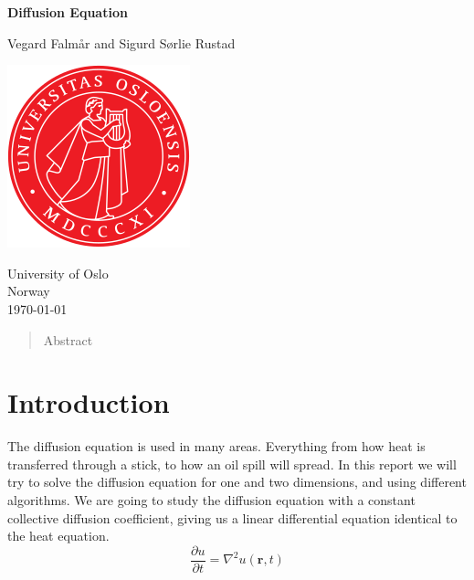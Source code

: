 \documentclass[reprint, english,notitlepage,nofootinbib]{revtex4-1}  %
\begin{document}
\begin{titlepage}
	\begin{center}
	\textbf{Diffusion Equation}

	\vspace{0.2cm}
	Vegard Falmår and Sigurd Sørlie Rustad

	\vspace{0.5cm}
	\includegraphics[scale=0.5]{../../pictures/UIO}
	\vspace{0.8cm}

	University of Oslo\\
	Norway\\
	\today	\\
	\end{center}
	\tableofcontents
	\clearpage
\end{titlepage}

\begin{abstract}
  Abstract
\end{abstract}
\maketitle                              %


\section{Introduction}
The diffusion equation is used in many areas. Everything from how heat is transferred through a stick, to how an oil spill will spread. In this report we will try to solve the diffusion equation for one and two dimensions, and using different algorithms. We are going to study the diffusion equation with a constant collective diffusion coefficient, giving us a linear differential equation identical to the heat equation.
\begin{equation*}
\frac{\partial u}{\partial t} = \nabla^2u(\mathbf{r}, t)
\end{equation*}
\end{document}
